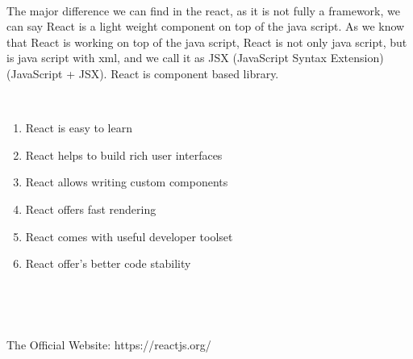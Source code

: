 \documentclass{article}
\begin{document}
\noindent 

\noindent 

\noindent \\
The major difference we can find in the react, as it is not fully a framework, we can say React is a light weight component on top of the java script. As we know that React is working on top of the java script, React is not only java script, but is java script with xml, and we call it as JSX (JavaScript Syntax Extension) (JavaScript + JSX). React is component based library.

\noindent 

\noindent 

\noindent 

\noindent 

\noindent \textbf{}

\noindent \textbf{\underbar{}}

\noindent \textbf{\underbar{}}

\noindent \\
\textbf{}

\begin{enumerate}
\item \textbf{ }React is easy to learn

\item  React helps to build rich user interfaces

\item  React allows writing custom components

\item  React offers fast rendering

\item  React comes with useful developer toolset

\item  React offer's better code stability\textbf{\underbar{}}
\end{enumerate}

\noindent \textbf{}

\noindent \\
\textbf{}

\noindent 

\noindent \\
\textbf{}

\noindent The Official Website: https://reactjs.org/

\noindent 

\noindent \\
\textbf{}
\end{document}
